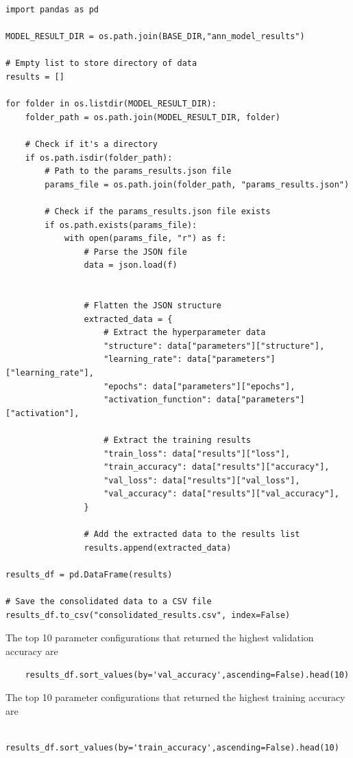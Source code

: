 \documentclass[a4paper]{article}
\begin{document}
\begin{lstlisting}
import pandas as pd

MODEL_RESULT_DIR = os.path.join(BASE_DIR,"ann_model_results")

# Empty list to store directory of data
results = []

for folder in os.listdir(MODEL_RESULT_DIR):
    folder_path = os.path.join(MODEL_RESULT_DIR, folder)
    
    # Check if it's a directory
    if os.path.isdir(folder_path):
        # Path to the params_results.json file
        params_file = os.path.join(folder_path, "params_results.json")

        # Check if the params_results.json file exists
        if os.path.exists(params_file):
            with open(params_file, "r") as f:
                # Parse the JSON file
                data = json.load(f)


                # Flatten the JSON structure
                extracted_data = {
                    # Extract the hyperparameter data
                    "structure": data["parameters"]["structure"],
                    "learning_rate": data["parameters"]["learning_rate"],
                    "epochs": data["parameters"]["epochs"],
                    "activation_function": data["parameters"]["activation"],
                    
                    # Extract the training results
                    "train_loss": data["results"]["loss"],
                    "train_accuracy": data["results"]["accuracy"],
                    "val_loss": data["results"]["val_loss"],
                    "val_accuracy": data["results"]["val_accuracy"],
                }

                # Add the extracted data to the results list
                results.append(extracted_data)

results_df = pd.DataFrame(results)

# Save the consolidated data to a CSV file
results_df.to_csv("consolidated_results.csv", index=False)
\end{lstlisting}

The top 10 parameter configurations that returned the highest validation accuracy are

\begin{lstlisting}
    results_df.sort_values(by='val_accuracy',ascending=False).head(10)
\end{lstlisting}

The top 10 parameter configurations that returned the highest training accuracy are
\begin{lstlisting}
    results_df.sort_values(by='train_accuracy',ascending=False).head(10)
\end{lstlisting}
\end{document}
